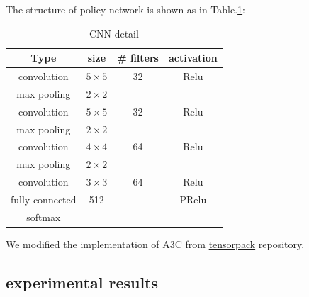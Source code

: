 The structure of policy network is shown as in Table.\ref{table.cnn_detail}:
\begin{table}[!ht]
	\centering
	\caption{CNN detail}
	\label{table.cnn_detail}
	\begin{tabular}{c|c|c|c}
		\textbf{Type} & \textbf{size} & \textbf{\# filters} & \textbf{activation} \\ \hline
		convolution & $5\times5$ & 32 & Relu \\ 
		max pooling & $2\times2$ &  &  \\
		convolution & $5\times5$ & 32 & Relu \\
		max pooling & $2\times2$ &  &  \\
		convolution & $4\times4$ & 64 & Relu \\
		max pooling & $2\times2$ &  &  \\
		convolution & $3\times3$ & 64 & Relu \\
		fully connected & 512 &  & PRelu \\
		softmax &  &  & 
	\end{tabular}
\end{table}
We modified the implementation of A3C from \href{https://github.com/ppwwyyxx/tensorpack}{tensorpack} repository.


\subsection{experimental results}




% 




